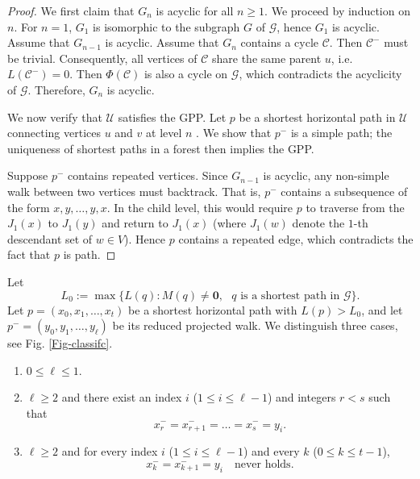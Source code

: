 \documentclass[reqno]{amsart}
\theoremstyle{plain}
\numberwithin{equation}{section}
\begin{document}
\begin{proof}
We first claim that $G_{n}$ is acyclic for all $n\geq 1.$ We proceed by
induction on $n$. For $n=1$, $G_{1}$ is isomorphic to the subgraph $G$ of $%
\mathcal{G}$, hence $G_{1}$ is acyclic. Assume that $G_{n-1}$ is acyclic.
Assume that $G_{n}$ contains a cycle $\mathcal{C}$. Then $\mathcal{C}^{-}$
must be trivial. Consequently, all vertices of $\mathcal{C}$ share the same
parent $u$, i.e. $L(\mathcal{C}^{-})=0$. Then $\Phi (\mathcal{C})$ is also a
cycle on $\mathcal{G}$, which contradicts the acyclicity of $\mathcal{G}$.
Therefore, $G_{n}$ is acyclic.

We now verify that $\mathcal{U}$ satisfies the GPP. Let $p$ be a shortest
horizontal path in $\mathcal{U}$ connecting vertices $u$ and $v$ at level $n$%
. We show that $p^{-}$ is a simple path; the uniqueness of shortest paths in
a forest then implies the GPP.

Suppose $p^{-}$ contains repeated vertices. Since $G_{n-1}$ is acyclic, any
non-simple walk between two vertices must backtrack. That is, $p^{-}$
contains a subsequence of the form $x,y,\dots ,y,x$. In the child level,
this would require $p$ to traverse from the $J_{1}(x)$ to $J_{1}(y)$ and
return to $J_{1}(x)$ (where $J_{1}(w)$ denote the $1$-th descendant set of $%
w\in V$). Hence $p$ contains a repeated edge, which contradicts the fact
that $p$ is path.
\end{proof}

Let 
\begin{equation*}
L_{0}:=\max \{L(q):M(q)\neq \mathbf{0},\text{ }q\text{ is a shortest path in 
}\mathcal{G}\}.
\end{equation*}%
Let $p=(x_{0},x_{1},\dots ,x_{t})$ be a shortest horizontal path with $%
L(p)>L_{0}$, and let $p^{-}=(y_{0},y_{1},\dots ,y_{\ell })$ be its reduced
projected walk. We distinguish three cases, see Fig. \ref{Fig-classifc}.

\begin{enumerate}
\item[\textbf{Case A.}] $0\leq \ell \leq 1$.

\item[\textbf{Case B.}] $\ell \geq 2$ and there exist an index $i$ ($1\leq
i\leq \ell -1$) and integers $r<s$ such that 
\begin{equation}
x_{r}^{-}=x_{r+1}^{-}=\dots =x_{s}^{-}=y_{i}.  \label{rsi}
\end{equation}

\item[\textbf{Case C.}] $\ell \geq 2$ and for every index $i$ ($1\leq i\leq
\ell -1$) and every $k$ ($0\leq k\leq t-1$), 
\begin{equation}
x_{k}^{-}=x_{k+1}^{-}=y_{i}\quad \text{never holds}.  \label{never}
\end{equation}
\end{enumerate}
\end{document}
